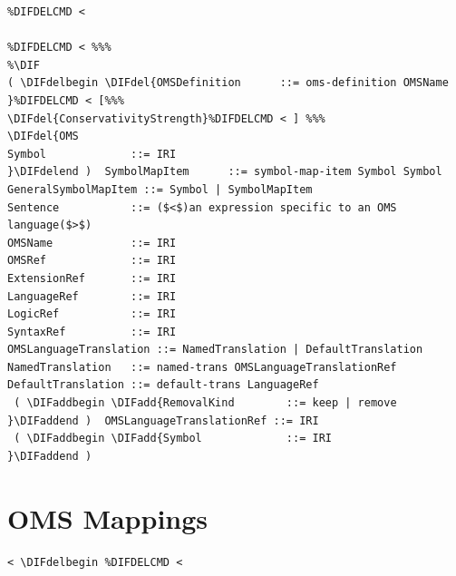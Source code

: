 \documentclass[10pt,fleqn,final]{scrreprt}
\newcommand*{\syntax}[1]{\texttt{#1}}
\newcommand{\sclause}[1]{\section{#1}}
\newenvironment{definitions}[0]{\medskip }{}
\providecommand{\DIFadd}[1]{{\protect\color{blue}\uwave{#1}}} %
\providecommand{\DIFdel}[1]{{\protect\color{red}\sout{#1}}}                      %
\providecommand{\DIFaddbegin}{} %
\providecommand{\DIFaddend}{} %
\providecommand{\DIFdelbegin}{} %
\providecommand{\DIFdelend}{} %
\begin{document}
\begin{definitions}


\begin{lstlisting}[language=ebnf,escapeinside={()}]  %%%
%DIF <  abstract syntax
%DIFDELCMD < 

%DIFDELCMD < %%%
%\DIF
( \DIFdelbegin \DIFdel{OMSDefinition      ::= oms-definition OMSName }%DIFDELCMD < [%%%
\DIFdel{ConservativityStrength}%DIFDELCMD < ] %%%
\DIFdel{OMS
Symbol             ::= IRI
}\DIFdelend )  SymbolMapItem      ::= symbol-map-item Symbol Symbol
GeneralSymbolMapItem ::= Symbol | SymbolMapItem
Sentence           ::= ($<$)an expression specific to an OMS language($>$) 
OMSName            ::= IRI
OMSRef             ::= IRI
ExtensionRef       ::= IRI
LanguageRef        ::= IRI
LogicRef           ::= IRI
SyntaxRef          ::= IRI
OMSLanguageTranslation ::= NamedTranslation | DefaultTranslation
NamedTranslation   ::= named-trans OMSLanguageTranslationRef
DefaultTranslation ::= default-trans LanguageRef
 ( \DIFaddbegin \DIFadd{RemovalKind        ::= keep | remove
}\DIFaddend )  OMSLanguageTranslationRef ::= IRI
 ( \DIFaddbegin \DIFadd{Symbol             ::= IRI
}\DIFaddend )
\end{lstlisting}

\sclause{OMS Mappings}

\begin{lstlisting}[language=ebnf,escapeinside={<>},mathescape]  % abstract syntax
 < \DIFdelbegin %DIFDELCMD < 


\end{lstlisting}
\end{definitions}
\end{document}
